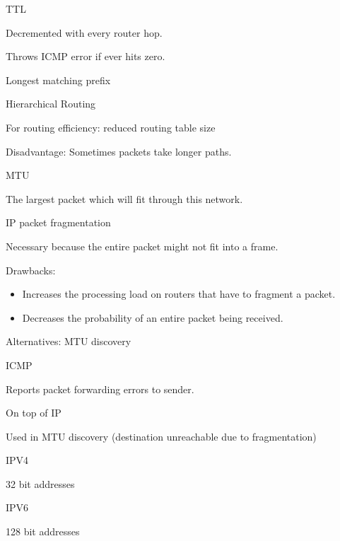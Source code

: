 \documentclass[main.tex]{subfiles}
\begin{document}
\begin{card}{TTL}
\item Decremented with every router hop.
\item Throws ICMP error if ever hits zero.
\end{card}

\begin{card}{Longest matching prefix}
\TODO
\end{card}

\begin{card}{Hierarchical Routing}
\item For routing efficiency: reduced routing table size
\item Disadvantage: Sometimes packets take longer paths.
\end{card}

\begin{card}{MTU}
\item The largest packet which will fit through this network.
\end{card}

\begin{card}{IP packet fragmentation}
\item Necessary because the entire packet might not fit into a frame.
\item Drawbacks:
    \begin{itemize}
        \item Increases the processing load on routers that have to fragment a packet.
        \item Decreases the probability of an entire packet being received.
    \end{itemize}
\item Alternatives: MTU discovery
\end{card}

\begin{card}{ICMP}
\item Reports packet forwarding errors to sender.
\item On top of IP
\item Used in MTU discovery (destination unreachable due to fragmentation)
\end{card}

\begin{card}{IPV4}
\item 32 bit addresses
\end{card}

\begin{card}{IPV6}
\item 128 bit addresses
\end{card}
\end{document}
